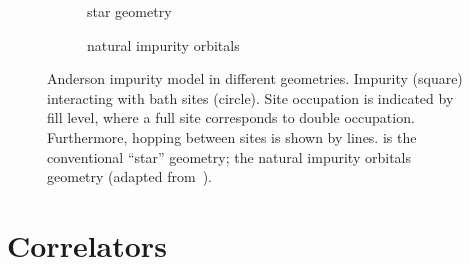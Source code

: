\begin{figure}[ht]
    \centering
    \savebox{\imagebox}{} %
    \begin{subfigure}{0.45\textwidth}
        \centering
        \usebox{\imagebox}
        \caption{star geometry}
        \label{subfig:geometry-star}
    \end{subfigure}
    \begin{subfigure}{0.45\textwidth}
        \centering
        \raisebox{\dimexpr0.5\ht\imagebox-0.5\height}
        {
            
        }
        \caption{natural impurity orbitals}
        \label{subfig:geometry-natural-impurity-orbitals}
    \end{subfigure}
    \caption{
        Anderson impurity model in different geometries.
        Impurity (square) interacting with bath sites (circle).
        Site occupation is indicated by fill level,
        where a full site corresponds to double occupation.
        Furthermore, hopping between sites is shown by lines.
         is the conventional ``star'' geometry;
         the natural impurity orbitals geometry
        (adapted from~\cite{Lu2019}).
    }
\end{figure}

\section{Correlators}

